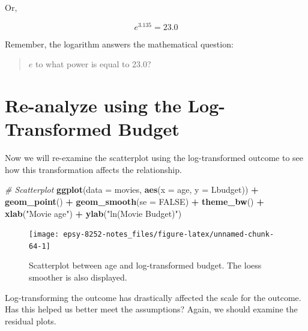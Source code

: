 \documentclass[]{book}
\newenvironment{Shaded}{\begin{snugshade}}{\end{snugshade}}
\newcommand{\CommentTok}[1]{\textcolor[rgb]{0.56,0.35,0.01}{\textit{#1}}}
\newcommand{\DataTypeTok}[1]{\textcolor[rgb]{0.13,0.29,0.53}{#1}}
\newcommand{\KeywordTok}[1]{\textcolor[rgb]{0.13,0.29,0.53}{\textbf{#1}}}
\newcommand{\NormalTok}[1]{#1}
\newcommand{\OperatorTok}[1]{\textcolor[rgb]{0.81,0.36,0.00}{\textbf{#1}}}
\newcommand{\OtherTok}[1]{\textcolor[rgb]{0.56,0.35,0.01}{#1}}
\newcommand{\StringTok}[1]{\textcolor[rgb]{0.31,0.60,0.02}{#1}}
\begin{document}
Or,

\[
e^{3.135} = 23.0
\]

Remember, the logarithm answers the mathematical question:

\begin{quote}
\(e\) to what power is equal to 23.0?
\end{quote}

\hypertarget{re-analyze-using-the-log-transformed-budget}{%
\section{Re-analyze using the Log-Transformed Budget}\label{re-analyze-using-the-log-transformed-budget}}

Now we will re-examine the scatterplot using the log-transformed outcome to see how this transformation affects the relationship.

\begin{Shaded}
\begin{Highlighting}[]
\CommentTok{# Scatterplot}
\KeywordTok{ggplot}\NormalTok{(}\DataTypeTok{data =}\NormalTok{ movies, }\KeywordTok{aes}\NormalTok{(}\DataTypeTok{x =}\NormalTok{ age, }\DataTypeTok{y =}\NormalTok{ Lbudget)) }\OperatorTok{+}
\StringTok{  }\KeywordTok{geom_point}\NormalTok{() }\OperatorTok{+}
\StringTok{  }\KeywordTok{geom_smooth}\NormalTok{(}\DataTypeTok{se =} \OtherTok{FALSE}\NormalTok{) }\OperatorTok{+}
\StringTok{  }\KeywordTok{theme_bw}\NormalTok{() }\OperatorTok{+}
\StringTok{  }\KeywordTok{xlab}\NormalTok{(}\StringTok{"Movie age"}\NormalTok{) }\OperatorTok{+}
\StringTok{  }\KeywordTok{ylab}\NormalTok{(}\StringTok{"ln(Movie Budget)"}\NormalTok{)}
\end{Highlighting}
\end{Shaded}

\begin{figure}

{\centering \texttt{[image: epsy-8252-notes\_files/figure-latex/unnamed-chunk-64-1]} 

}

\caption{Scatterplot between age and log-transformed budget. The loess smoother is also displayed.}\label{fig:unnamed-chunk-64}
\end{figure}

Log-transforming the outcome has drastically affected the scale for the outcome. Has this helped us better meet the assumptions? Again, we should examine the residual plots.
\end{document}
